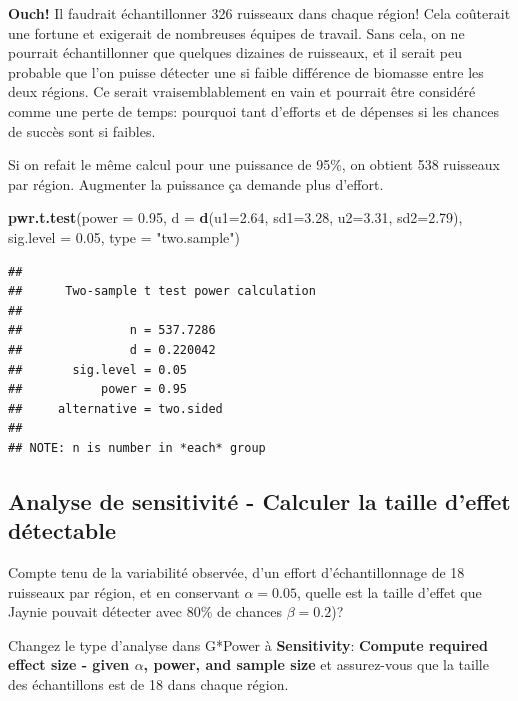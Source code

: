 \documentclass[12pt,]{book}
\makeatletter
\newenvironment{Shaded}{\begin{snugshade}}{\end{snugshade}}
\newcommand{\DataTypeTok}[1]{\textcolor[rgb]{0.13,0.29,0.53}{#1}}
\newcommand{\FloatTok}[1]{\textcolor[rgb]{0.00,0.00,0.81}{#1}}
\newcommand{\KeywordTok}[1]{\textcolor[rgb]{0.13,0.29,0.53}{\textbf{#1}}}
\newcommand{\NormalTok}[1]{#1}
\newcommand{\StringTok}[1]{\textcolor[rgb]{0.31,0.60,0.02}{#1}}
\newenvironment{kframe}{%
\medskip{}
\setlength{\fboxsep}{.8em}
\def\at@end@of@kframe{}%
\ifinner\ifhmode%
 \def\at@end@of@kframe{\end{minipage}}%
 \begin{minipage}{\columnwidth}%
\fi\fi%
\def\FrameCommand##1{\hskip\@totalleftmargin \hskip-\fboxsep
\colorbox{incolor}{##1}\hskip-\fboxsep
    \hskip-\linewidth \hskip-\@totalleftmargin \hskip\columnwidth}%
\MakeFramed {\advance\hsize-\width
  \@totalleftmargin\z@ \linewidth\hsize
  \@setminipage}}%
{\par\unskip\endMakeFramed%
\at@end@of@kframe}
\newenvironment{rmdblock}[1]
 {
 \begin{itemize}
 \renewcommand{\labelitemi}{
   \raisebox{-.7\height}[0pt][0pt]{
     {\setkeys{Gin}{width=3em,keepaspectratio}\texttt{[image: images/\#1]}}
   }
 }
 \begin{kframe}
 \setlength{\fboxsep}{1em}
 \item
 }
 {
 \end{kframe}
 \end{itemize}
 }
\newenvironment{rmdcode}
  {\begin{rmdblock}{screen}}
  {\end{rmdblock}}
\makeatother
\begin{document}
\textbf{Ouch!} Il faudrait échantillonner 326 ruisseaux dans chaque région! Cela coûterait une fortune et exigerait de nombreuses équipes de travail.
Sans cela, on ne pourrait échantillonner que quelques dizaines de ruisseaux, et il serait peu probable que l'on puisse détecter une si faible différence de biomasse entre les deux régions.
Ce serait vraisemblablement en vain et pourrait être considéré comme une perte de temps: pourquoi tant d'efforts et de dépenses si les chances de succès sont si faibles.

Si on refait le même calcul pour une puissance de 95\%, on obtient 538 ruisseaux par région.
Augmenter la puissance ça demande plus d'effort.

\begin{Shaded}
\begin{Highlighting}[]
\KeywordTok{pwr.t.test}\NormalTok{(}\DataTypeTok{power =} \FloatTok{0.95}\NormalTok{, }\DataTypeTok{d =} \KeywordTok{d}\NormalTok{(}\DataTypeTok{u1=}\FloatTok{2.64}\NormalTok{, }\DataTypeTok{sd1=}\FloatTok{3.28}\NormalTok{, }\DataTypeTok{u2=}\FloatTok{3.31}\NormalTok{, }\DataTypeTok{sd2=}\FloatTok{2.79}\NormalTok{), }\DataTypeTok{sig.level =} \FloatTok{0.05}\NormalTok{, }\DataTypeTok{type =} \StringTok{"two.sample"}\NormalTok{)}
\end{Highlighting}
\end{Shaded}

\begin{verbatim}
## 
##      Two-sample t test power calculation 
## 
##               n = 537.7286
##               d = 0.220042
##       sig.level = 0.05
##           power = 0.95
##     alternative = two.sided
## 
## NOTE: n is number in *each* group
\end{verbatim}

\hypertarget{analyse-de-sensitivituxe9---calculer-la-taille-deffet-duxe9tectable}{%
\subsection{Analyse de sensitivité - Calculer la taille d'effet détectable}\label{analyse-de-sensitivituxe9---calculer-la-taille-deffet-duxe9tectable}}

Compte tenu de la variabilité observée, d'un effort d'échantillonnage de 18 ruisseaux par région, et en conservant \(\alpha=0.05\), quelle est la taille d'effet que Jaynie pouvait détecter avec 80\% de chances \(\beta=0.2\))?

\begin{rmdcode}
Changez le type d'analyse dans G*Power à \textbf{Sensitivity}: \textbf{Compute required effect size - given \(\alpha\), power, and sample size} et assurez-vous que la taille des échantillons est de 18 dans chaque région.
\end{rmdcode}
\end{document}
